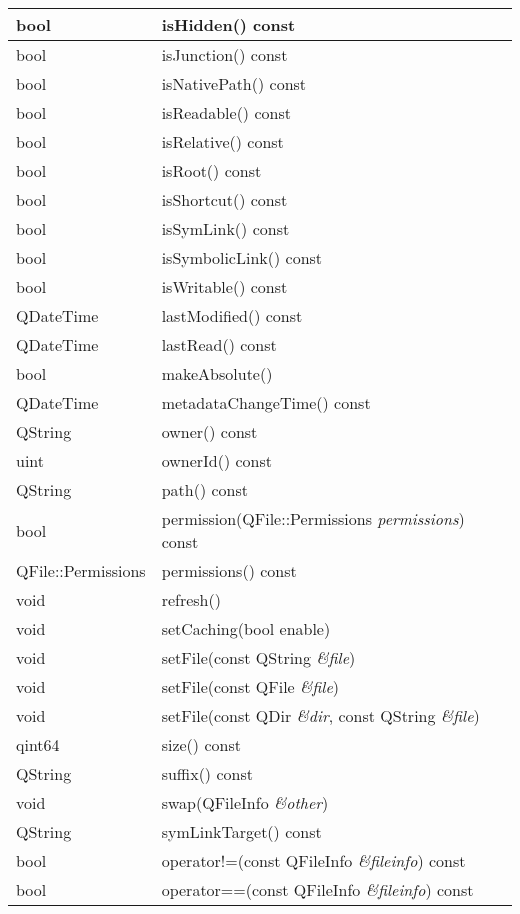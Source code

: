 \begin{longtable}[l]{|l|l|}
\hline
bool& 	isHidden() const\\
\hline
bool& 	isJunction() const\\
\hline
bool& 	isNativePath() const\\
\hline
bool& 	isReadable() const\\
\hline
bool& 	isRelative() const\\
\hline
bool& 	isRoot() const\\
\hline
bool& 	isShortcut() const\\
\hline
bool& 	isSymLink() const\\
\hline
bool& 	isSymbolicLink() const\\
\hline
bool& 	isWritable() const\\
\hline
QDateTime& 	lastModified() const\\
\hline
QDateTime& 	lastRead() const\\
\hline
bool& 	makeAbsolute()\\
\hline
QDateTime& 	metadataChangeTime() const\\
\hline
QString& 	owner() const\\
\hline
uint& 	ownerId() const\\
\hline
QString& 	path() const\\
\hline
bool& 	permission(QFile::Permissions \emph{permissions}) const\\
\hline
QFile::Permissions& 	permissions() const\\
\hline
void& 	refresh()\\
\hline
void& 	setCaching(bool enable)\\
\hline
void& 	setFile(const QString \emph{\&file})\\
\hline
void& 	setFile(const QFile \emph{\&file})\\
\hline
void& 	setFile(const QDir \emph{\&dir}, const QString \emph{\&file})\\
\hline
qint64& 	size() const\\
\hline
QString& 	suffix() const\\
\hline
void& 	swap(QFileInfo \emph{\&other})\\
\hline
QString& 	symLinkTarget() const\\
\hline
bool& 	operator!=(const QFileInfo \emph{\&fileinfo}) const\\
\hline
bool& 	operator==(const QFileInfo \emph{\&fileinfo}) const\\
\hline
\end{longtable}

\splitLine

